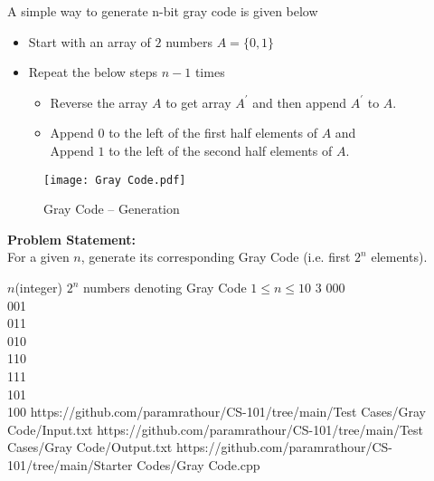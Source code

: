 A simple way to generate n-bit gray code is given below
\begin{itemize}	
	\item Start with an array of $2$ numbers $A = \{0, 1\}$
	\item Repeat the below steps $n-1$ times
	\begin{itemize}
		\item Reverse the array $A$ to get array $A^\prime$  and then append $A^\prime$  to $A$.
		\item Append $0$ to the left of the first half elements of $A$ and\\
		Append $1$ to the left of the second half elements of $A$.
	\end{itemize}
\end{itemize}
\begin{figure}[H]
	\centering
	\texttt{[image: Gray Code.pdf]}
	\caption{Gray Code -- Generation}
\end{figure}
\vspace{-2em}
\textbf{Problem Statement:}\\
For a given $n$, generate its corresponding Gray Code (i.e. first $2^n$ elements).
\begin{testcasesMore}
	{$n$\hfill(integer)}
	{$2^n$ numbers denoting Gray Code}
	{$1 \leq n \leq 10$}
	{3}
	{000\\001\\011\\010\\110\\111\\101\\100}
	{https://github.com/paramrathour/CS-101/tree/main/Test Cases/Gray Code/Input.txt}
	{https://github.com/paramrathour/CS-101/tree/main/Test Cases/Gray Code/Output.txt}
	{https://github.com/paramrathour/CS-101/tree/main/Starter Codes/Gray Code.cpp}
\end{testcasesMore}